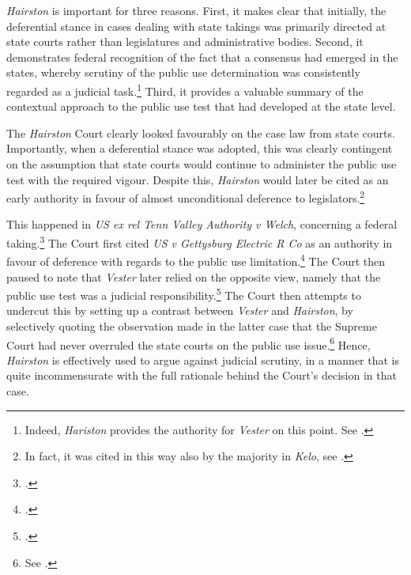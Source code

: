 {\it Hairston} is important for three reasons. First, it makes clear that initially, the deferential stance in cases dealing with state takings was primarily directed at state courts rather than legislatures and administrative bodies. Second, it demonstrates federal recognition of the fact that a consensus had emerged in the states, whereby scrutiny of the public use determination was consistently regarded as a judicial task.\footnote{Indeed, {\it Hariston} provides the authority for {\it Vester} on this point. See \cite[606]{vester30}.} Third, it provides a valuable summary of the contextual approach to the public use test that had developed at the state level. 

The {\it Hairston} Court clearly looked favourably on the case law from state courts. Importantly, when a deferential stance was adopted, this was clearly contingent on the assumption that state courts would continue to administer the public use test with the required vigour. Despite this, {\it Hairston} would later be cited as an early authority in favour of almost unconditional deference to legislators.\footnote{In fact, it was cited in this way also by the majority in {\it Kelo}, see \cite[482-483]{kelo05}.} 

This happened in {\it US ex rel Tenn Valley Authority v Welch}, concerning a federal taking.\footcite[552]{welch46} The Court first cited {\it US v Gettysburg Electric R Co} as an authority in favour of deference with regards to the public use limitation.\footcite{gettysburg96} The Court then paused to note that {\it Vester} later relied on the opposite view, namely that the public use test was a judicial responsibility.\footcite{vester30} The Court then attempts to undercut this by setting up a contrast between {\it Vester} and {\it Hairston}, by selectively quoting the observation made in the latter case that the Supreme Court had never overruled the state courts on the public use issue.\footnote{See \cite[552]{welch46}.} Hence, {\it Hairston} is effectively used to argue against judicial scrutiny, in a manner that is quite incommensurate with the full rationale behind the Court's decision in that case.

